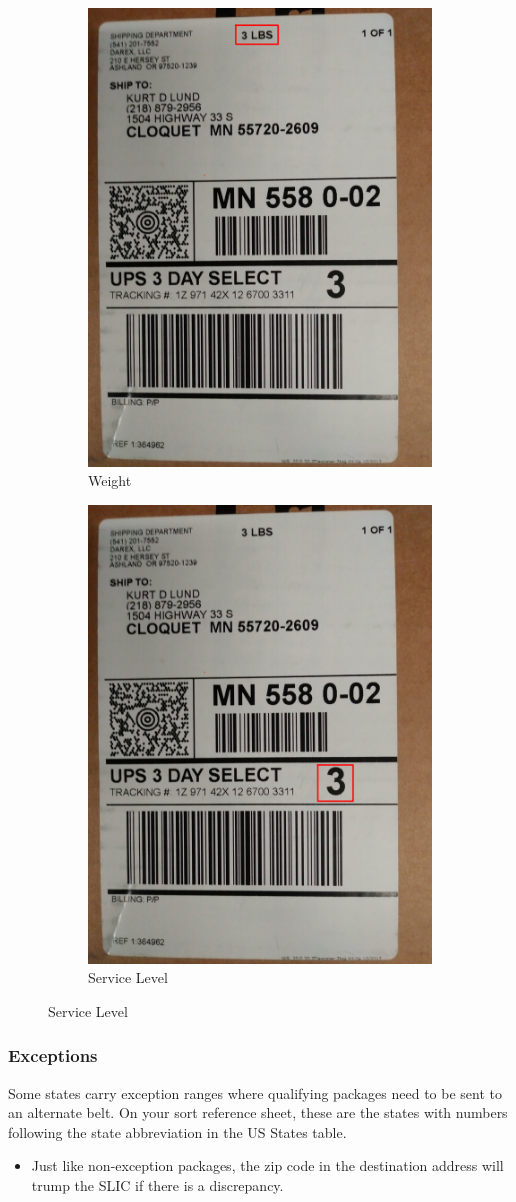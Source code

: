 \documentclass[12pt]{article}
\begin{document}
\begin{figure}[H]
\begin{subfigure}{0.5\textwidth}
\includegraphics[width=0.5\linewidth]{20171221_161952_weight}
\caption{Weight}
\end{subfigure}
\begin{subfigure}{0.5\textwidth}
\centering
\includegraphics[width=0.5\linewidth]{20171221_161952_service.jpg}
\caption{Service Level}
\end{subfigure}
\end{figure}

\subsubsection{Exceptions}
Some states carry exception ranges where qualifying packages need to be sent to an alternate belt. On your sort reference sheet, these are the states with numbers following the state abbreviation in the US States table. 

\begin{itemize}
    \item Just like non-exception packages, the zip code in the destination address will trump the SLIC if there is a discrepancy. 
\end{itemize}
\end{document}
